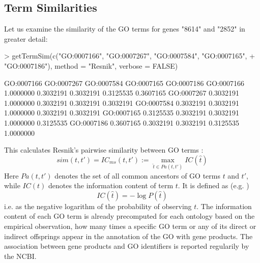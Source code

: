 \documentclass[12pt,a4paper]{article}
\begin{document}
\subsection{Term Similarities}

Let us examine the similarity of the GO terms for genes "8614" and "2852" in greater detail:
\begin{Schunk}
\begin{Sinput}
> getTermSim(c("GO:0007166", "GO:0007267", "GO:0007584", "GO:0007165", 
+     "GO:0007186"), method = "Resnik", verbose = FALSE)
\end{Sinput}
\begin{Soutput}
           GO:0007166 GO:0007267 GO:0007584 GO:0007165 GO:0007186
GO:0007166  1.0000000  0.3032191  0.3032191  0.3125535  0.3607165
GO:0007267  0.3032191  1.0000000  0.3032191  0.3032191  0.3032191
GO:0007584  0.3032191  0.3032191  1.0000000  0.3032191  0.3032191
GO:0007165  0.3125535  0.3032191  0.3032191  1.0000000  0.3125535
GO:0007186  0.3607165  0.3032191  0.3032191  0.3125535  1.0000000
\end{Soutput}
\end{Schunk}
This calculates Resnik's pairwise similarity between GO terms \cite{Resnik95,Resnik99}:
\begin{equation}
sim(t,t') = IC_{ms}(t,t') := \max_{\hat{t}\in Pa(t,t')} IC(\hat{t})\label{eq:Resnik}
\end{equation}
Here $Pa(t,t')$ denotes the set of all common ancestors of GO terms $t$ and $t'$, while $IC(t)$  denotes the information content of term $t$. It is defined as (e.g. \cite{Lord03})
\begin{equation}
IC(\hat{t}) = -\log P(\hat{t})
\end{equation}
i.e. as the negative logarithm of the probability of observing $t$. The information content of each GO term is already precomputed for each ontology based on the empirical observation, how many times a specific GO term or any of its direct or indirect offsprings appear in the annotation of the GO with gene products. The association between gene products and GO identifiers is reported regularily by the NCBI.
\end{document}

